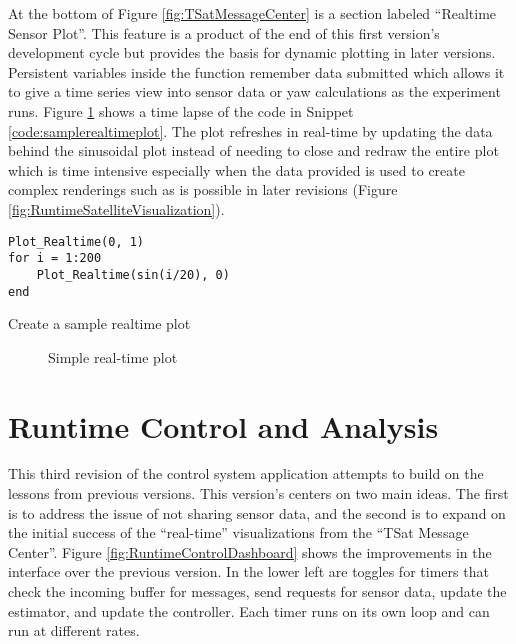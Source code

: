 At the bottom of Figure \ref{fig:TSatMessageCenter} is a section labeled ``Realtime Sensor Plot''.  This feature is a product of the end of this first version's development cycle but provides the basis for dynamic plotting in later versions.  Persistent variables inside the function remember data submitted which allows it to give a time series view into sensor data or yaw calculations as the experiment runs.  Figure \ref{fig:SimpleRealtime} shows a time lapse of the code in Snippet \ref{code:samplerealtimeplot}.  The plot refreshes in real-time by updating the data behind the sinusoidal plot instead of needing to close and redraw the entire plot which is time intensive especially when the data provided is used to create complex renderings such as is possible in later revisions (Figure \ref{fig:RuntimeSatelliteVisualization}).

\begin{listing}[H]
\begin{singlespace}
  \begin{verbatim}
Plot_Realtime(0, 1)
for i = 1:200
    Plot_Realtime(sin(i/20), 0)
end
  \end{verbatim}
\caption{Create a sample realtime plot}
\label{code:samplerealtimeplot}
\nocite{minted}
\end{singlespace}
\end{listing}
\begin{figure}[ht]
  \centerline{}
  \caption{Simple real-time plot}
  \label{fig:SimpleRealtime}
\end{figure}

\section{Runtime Control and Analysis}
\label{sec:RuntimeControlandAnalysis}

This third revision of the control system application attempts to build on the lessons from previous versions.  This version's centers on two main ideas.  The first is to address the issue of not sharing sensor data, and the second is to expand on the initial success of the ``real-time'' visualizations from the ``TSat Message Center''.  Figure \ref{fig:RuntimeControlDashboard} shows the improvements in the interface over the previous version.  In the lower left are toggles for timers that check the incoming buffer for messages, send requests for sensor data, update the estimator, and update the controller.  Each timer runs on its own loop and can run at different rates.

